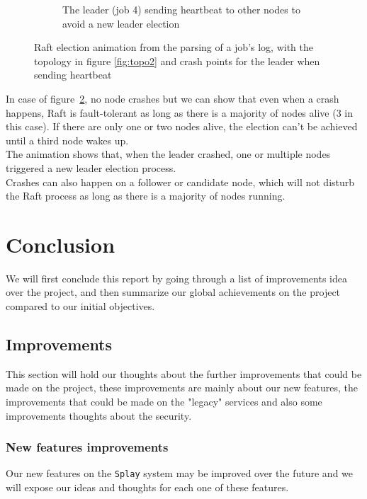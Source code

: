 \documentclass{eplmastersthesis}
\begin{document}
\begin{figure}[H]
\begin{subfigure}{.45\textwidth}
            \caption{The leader (job 4) sending heartbeat to other nodes to avoid a new leader election}
            \label{fig:ele4}
          \end{subfigure}

          \caption{Raft election animation from the parsing of a job's log, with the topology in figure \ref{fig:topo2}
          and crash points for the leader when sending heartbeat}
          \label{fig:election}
        \end{figure}

        In case of figure~\ref{fig:election}, no node crashes but we can show
        that even when a crash happens, Raft is fault-tolerant as long as there
        is a majority of nodes alive (3 in this case). If there are only one or
        two nodes alive, the election can't be achieved until a third node
        wakes up.\\
        The animation shows that, when the leader crashed, one or multiple
        nodes triggered a new leader election process.\\
        Crashes can also happen on a follower or candidate node, which will not
        disturb the Raft process as long as there is a majority of nodes
        running.

  \chapter{Conclusion}

    We will first conclude this report by going through a list of improvements
    idea over the project, and then summarize our global achievements on the
    project compared to our initial objectives.

    \section{Improvements}

      This section will hold our thoughts about the further improvements
      that could be made on the project, these improvements are mainly about
      our new features, the improvements that could be made on the "legacy"
      services and also some improvements thoughts about the security.

      \subsection{New features improvements}

        Our new features on the \texttt{Splay} system may be improved over the future
        and we will expose our ideas and thoughts for each one of these
        features.
\end{document}

